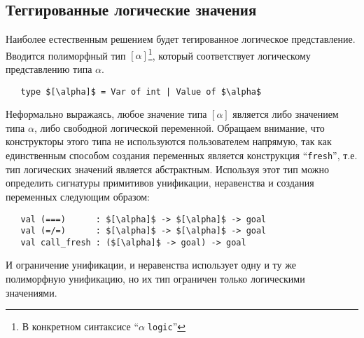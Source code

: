 \subsection{Теггированные логические значения}

Наиболее естественным решением будет тегированное логическое представление.
Вводится полиморфный тип $[\alpha]$\footnote{В конкретном синтаксисе ``$\alpha\;$\lstinline|logic|''}, который соответствует логическому представлению типа $\alpha$.


\begin{lstlisting}
   type $[\alpha]$ = Var of int | Value of $\alpha$
\end{lstlisting}

\noindent Неформально выражаясь, любое значение типа $[\alpha]$ является либо значением типа $\alpha$, либо свободной логической переменной.
Обращаем внимание, что конструкторы этого типа не используются пользователем напрямую, так как единственным способом создания переменных является конструкция \enquote{\lstinline=fresh=}, т.е. тип логических значений является абстрактным.
Используя этот тип можно определить сигнатуры примитивов унификации, неравенства и создания переменных следующим образом:


\begin{lstlisting}
   val (===)      : $[\alpha]$ -> $[\alpha]$ -> goal
   val (=/=)      : $[\alpha]$ -> $[\alpha]$ -> goal
   val call_fresh : ($[\alpha]$ -> goal) -> goal
\end{lstlisting}

\noindent И ограничение унификации, и неравенства использует одну и ту же полиморфную унификацию, но их тип ограничен только логическими значениями.

